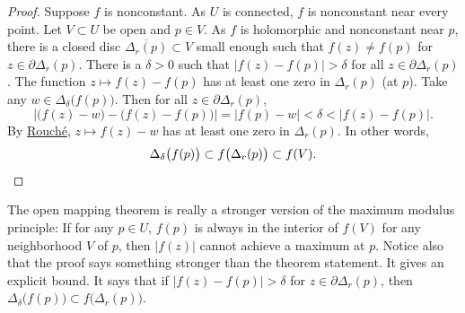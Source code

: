 \documentclass[12pt,openany]{book}
\newcommand{\sabs}[1]{\lvert {#1} \rvert}
\newcommand{\abs}[1]{\left\lvert {#1} \right\rvert}
\theoremstyle{plain}
\theoremstyle{remark}
\theoremstyle{definition}
\theoremstyle{exercise}
\theoremstyle{example}
\begin{document}
\begin{proof}
Suppose $f$ is nonconstant.  As $U$ is connected, $f$ is nonconstant
near every point.
Let $V \subset U$ be open and $p \in V$.
As $f$
is holomorphic and nonconstant near $p$,  
there is a closed disc $\overline{\Delta_r(p)} \subset V$ small enough such that
$f(z) \not= f(p)$ for $z \in \partial \Delta_r(p)$.
There is a $\delta > 0$ such
that $\abs{f(z)-f(p)} > \delta$ for all $z \in \partial \Delta_r(p)$.
The function $z \mapsto f(z)-f(p)$ has at least one zero in $\Delta_r(p)$
(at $p$).  Take any $w \in \Delta_{\delta}\bigl(f(p)\bigr)$.  Then for
all $z \in \partial \Delta_r(p)$,
\begin{equation*}
\abs{\bigl( f(z)-w \bigr) - \bigl( f(z)-f(p) \bigr)} = \abs{f(p)-w} <
\delta < \abs{f(z)-f(p)} .
\end{equation*}
By \hyperref[thm:rouche2]{Rouch\'e}, $z \mapsto f(z)-w$ has at least one
zero in $\Delta_r(p)$.
In other words,
\begin{equation*}
\Delta_{\delta}\bigl(f(p)\bigr) \subset
f\bigl(\Delta_r(p)\bigr) \subset f(V) .  \qedhere
\end{equation*}
\end{proof}

The open mapping theorem is really a stronger version of
the maximum modulus principle:
If for any $p \in U$,
$f(p)$ is always in the interior of $f(V)$ for any neighborhood $V$ of
$p$, then $\sabs{f(z)}$ cannot achieve a maximum at $p$.
Notice also that the proof says something stronger than the theorem statement.  It
gives an explicit bound.  It says that if 
$\abs{f(z)-f(p)} > \delta$ for $z \in \partial \Delta_r(p)$,
then
$\Delta_{\delta}\bigl(f(p)\bigr) \subset f\bigl(\Delta_r(p)\bigr)$.
\end{document}

